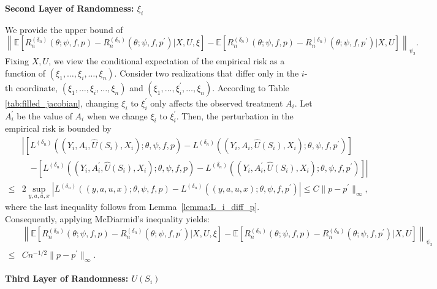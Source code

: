 \documentclass[12pt]{article}
\newcommand{\E}{\mathbb{E}}
\begin{document}
\noindent\textbf{Second Layer of Randomness: $\xi_i$}

\noindent We provide the upper bound of
$$\left\|\E\left[R_n^{(\delta_n)}(\theta;\psi,f,p)-R_n^{({\delta_n})}(\theta;\psi,f,p^\prime)|X,U,\xi\right]-\E\left[R_n^{(\delta_n)}(\theta;\psi,f,p)-R_n^{({\delta_n})}(\theta;\psi,f,p^\prime)|X,U\right]\right\|_{\psi_2}.$$
Fixing $X,U$, we view the conditional expectation of the empirical risk as a function of $(\xi_1, \ldots,\xi_i,\ldots, \xi_n)$. Consider two realizations that differ only in the $i$-th coordinate, $(\xi_1, \ldots,\xi_i,\ldots, \xi_n)$ and $(\xi_1, \ldots,\xi_i^\prime,\ldots, \xi_n)$. According to Table \ref{tab:filled_jacobian}, changing $\xi_i$ to $\xi_i^\prime$ only affects the observed treatment $A_i$. Let $A_i^\prime$ be the value of $A_i$ when we change $\xi_i$ to $\xi_i^\prime$. Then, the perturbation in the empirical risk is bounded by
\begin{align*}
&\left|\left[L^{(\delta_n)}((Y_i,A_i,\widehat U(S_i),X_i);\theta,\psi,f,p) - L^{(\delta_n)}((Y_i,A_i,\widehat U(S_i),X_i);\theta,\psi,f,p^\prime)\right]\right.\\
        &\quad\left.-\left[L^{(\delta_n)}((Y_i,A_i^\prime,\widehat U(S_i),X_i);\theta,\psi,f,p) - L^{(\delta_n)}((Y_i,A_i^\prime,\widehat U(S_i),X_i);\theta,\psi,f,p^\prime)\right]\right|\\
        \leq  & 2\sup_{y,a,u,x}\left|L^{(\delta_n)}((y,a,u,x);\theta,\psi,f,p) - L^{(\delta_n)}((y,a,u,x);\theta,\psi,f,p^\prime)\right|
        \leq  C\|p-p^\prime\|_\infty,
\end{align*}
where the last inequality follows from Lemma~\ref{lemma:L_i_diff_p}. Consequently, applying McDiarmid's inequality yields:
\begin{align*}
    &\left\|\E\left[R_n^{(\delta_n)}(\theta;\psi,f,p)-R_n^{({\delta_n})}(\theta;\psi,f,p^\prime)|X,U,\xi\right]-\E\left[R_n^{(\delta_n)}(\theta;\psi,f,p)-R_n^{({\delta_n})}(\theta;\psi,f,p^\prime)|X,U\right]\right\|_{\psi_2}\\
    \leq & C n^{-1/2}\|p - p^\prime\|_{\infty}.
\end{align*}

\noindent\textbf{Third Layer of Randomness: $U(S_i)$}
\end{document}
